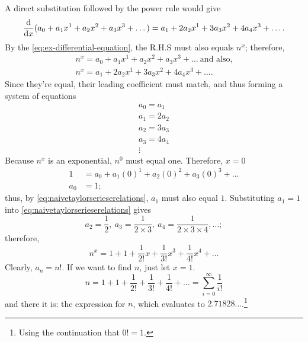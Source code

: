 A direct substitution followed by the power rule would give
\begin{equation}
    \odv*{(a_0 + a_1x^1 + a_2x^2 + a_3x^3 + \dots)}{x} = a_1 + 2a_2x^1 + 3a_3x^2 + 4a_4x^3 + \dots.
\end{equation}
By the \cref{eq:ex-differential-equation}, the R.H.S must also equals $n^x$; therefore,
\begin{equation}
	\begin{multlined}
		n^x = a_0 + a_1x^1 + a_2x^2 + a_3x^3 + \dots ~\textrm{and also,} \\
		n^x = a_1 + 2a_2x^1 + 3a_3x^2 + 4a_4x^3 + \dots.
	\end{multlined}
\end{equation}
Since they're equal, their leading coefficient must match, and thus forming a system of equations
\begin{equation}
    \begin{array}{c}
    a_0 = a_1 \\ a_1 = 2a_2 \\ a_2 = 3a_3 \\ a_3 = 4a_4 \\ \vdots
    \end{array}\label{eq:naivetaylorserieserelations}
\end{equation}
Because $n^x$ is an exponential, $n^0$ must equal one. Therefore, $x = 0$
\begin{align*}
    1 &= a_0 + a_1(0)^1 + a_2(0)^2 + a_3(0)^3 + \dots \\
    a_0 &= 1;
\end{align*}
thus, by \cref{eq:naivetaylorserieserelations}, $a_1$ must also equal $1$. Substituting $a_1 = 1$ into \cref{eq:naivetaylorserieserelations} gives
\begin{equation}
	a_2 = \frac{1}{2},~a_3 = \frac{1}{2 \times 3},~a_4 = \frac{1}{2 \times 3 \times 4}, \dots;
\end{equation}
therefore,
\begin{equation*}
    n^x = 1 + 1 + \frac{1}{2!}x + \frac{1}{3!}x^3 + \frac{1}{4!}x^4 + \dots
\end{equation*}
Clearly, $a_n = n!$. If we want to find $n$, just let $x = 1$.
\begin{equation*}
	n = 1 + 1 + \frac{1}{2!} + \frac{1}{3!} + \frac{1}{4!} + \dots = \sum_{i = 0}^{\infty}\frac{1}{i!}
\end{equation*}
and there it is: the expression for $n$, which evaluates to $2.71828\dots$.\footnote{Using the continuation that $0! = 1$.}

